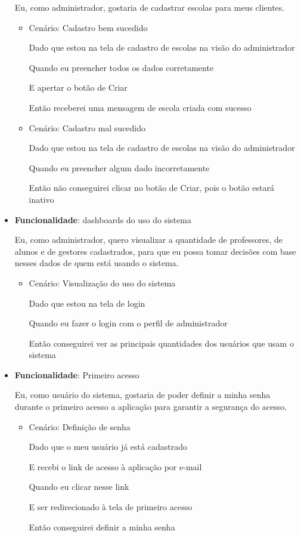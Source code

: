 \begin{itemize}
    Eu, como administrador, gostaria de cadastrar escolas para meus clientes.
    \begin{itemize}
        \item Cenário: Cadastro bem sucedido  
        \par Dado que estou na tela de cadastro de escolas na visão do administrador
        \par Quando eu preencher todos os dados corretamente
        \par E apertar o botão de Criar
        \par Então receberei uma mensagem de escola criada com sucesso
    \end{itemize}   
    \begin{itemize}
        \item Cenário: Cadastro mal sucedido  
        \par Dado que estou na tela de cadastro de escolas na visão do administrador
        \par Quando eu preencher algum dado incorretamente
        \par Então não conseguirei clicar no botão de Criar, pois o botão estará inativo
    \end{itemize}    

\item\textbf{Funcionalidade}: \glspl{dashboard} do uso do sistema
    
    Eu, como administrador, quero visualizar a quantidade de professores, de alunos e de gestores cadastrados, para que eu possa tomar decisões com base nesses dados de quem está usando o sistema.
    \begin{itemize}
        \item Cenário: Visualização do uso do sistema 
        \par Dado que estou na tela de login
        \par Quando eu fazer o login com o perfil de administrador
        \par Então conseguirei ver as principais quantidades dos usuários que usam o sistema
    \end{itemize} 

\item\textbf{Funcionalidade}: Primeiro acesso
    
    Eu, como usuário do sistema, gostaria de poder definir a minha senha durante o primeiro acesso a aplicação para garantir a segurança do acesso.
    \begin{itemize}
        \item Cenário: Definição de senha  
        \par Dado que o meu usuário já está cadastrado
        \par E recebi o \gls{link} de acesso à aplicação por e-mail
        \par Quando eu clicar nesse \gls{link}
        \par E ser redirecionado à tela de primeiro acesso
        \par Então conseguirei definir a minha senha
    \end{itemize}


\end{itemize}
